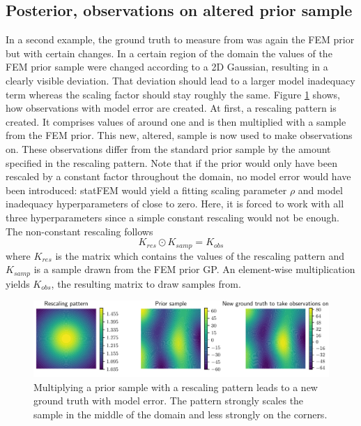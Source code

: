 \documentclass[%
  a4paper,oneside,%
  11pt,%
  smallchapters,
  style=printdev,
  extramargin,
  green,%
  rgb, <cmyk>
  ]{tubsbook}
\begin{document}
\FloatBarrier

\subsection{Posterior, observations on altered prior sample}
\label{sec:PostModErr}
In a second example, the ground truth to measure from was again the FEM prior but with certain changes. In a certain region of the domain the values of the FEM prior sample were changed according to a 2D Gaussian, resulting in a clearly visible deviation. That deviation should lead to a larger model inadequacy term whereas the scaling factor should stay roughly the same. Figure \ref{fig:ObsPat} shows, how observations with model error are created. At first, a rescaling pattern is created. It comprises values of around one and is then multiplied with a sample from the FEM prior. This new, altered, sample is now used to make observations on. These observations differ from the standard prior sample by the amount specified in the rescaling pattern. Note that if the prior would only have been rescaled by a constant factor throughout the domain, no model error would have been introduced: statFEM would yield a fitting scaling parameter $\rho$ and model inadequacy hyperparameters of close to zero. Here, it is forced to work with all three hyperparameters since a simple constant rescaling would not be enough. The non-constant rescaling follows
\begin{equation}
K_{res} \odot K_{samp} = K_{obs}
\end{equation}
where $K_{res}$ is the matrix which contains the values of the rescaling pattern and $K_{samp}$ is a sample drawn from the FEM prior GP. An element-wise multiplication yields $K_{obs}$, the resulting matrix to draw samples from.
\begin{figure}[!ht]
\includegraphics[width=1\textwidth]{pics/ObsPattern.pdf}
\centering
\caption[Illustration of the ground truth with model error]{Multiplying a prior sample with a rescaling pattern leads to a new ground truth with model error. The pattern strongly scales the sample in the middle of the domain and less strongly on the corners.}
\label{fig:ObsPat}
\end{figure}
\end{document}
